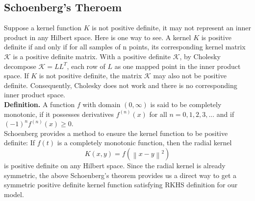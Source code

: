 \documentclass[12pt]{report} %
\newcommand{\norm}[1]{\left\lVert #1 \right\rVert}
\begin{document}
\subsection{Schoenberg's Theroem}
Suppose a kernel function $K$ is not positive definite, it may not represent an inner product in any Hilbert space. Here is one way to see. A kernel $K$ is positive definite if and only if for all samples of n points, its corresponding kernel matrix $\mathcal{K}$ is a positive definite matrix. With a positive definite $\mathcal{K}$, by Cholesky decompose $\mathcal{K}=LL^T$, each row of $L$ as one mapped point in the inner product space. If $K$ is not positive definite, the matrix $\mathcal{K}$ may also not be positive definite. Consequently, Cholesky does not work and there is no corresponding inner product space. \\
\textbf{Definition.} A function $f$ with domain $(0, \infty)$ is said to be completely monotonic, if it possesses derivatives $f^{(n)}(x)$ for all $n=0,1,2,3,...$ and if $(-1)^nf^{(n)}(x) \geq 0$\cite{CMF}. \\
Schoenberg\cite{Schoenberg} provides a method to ensure the kernel function to be positive definite: If \(f(t)\) is a completely monotonic function, then the radial kernel
\begin{equation}
K(x,y)=f(\norm{x-y}^2)
\end{equation}
is positive definite on any Hilbert space. Since the radial kernel is already symmetric, the above Schoenberg's theorem provides us a direct way to get a symmetric positive definite kernel function satisfying RKHS definition for our model.
\end{document}
